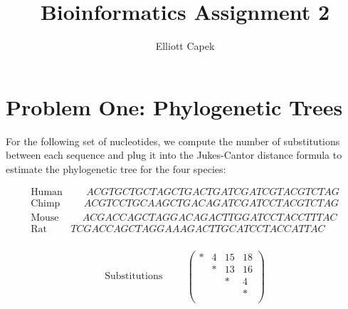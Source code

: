 \documentclass[10pt]{article} %
\title{Bioinformatics Assignment 2}
\author{Elliott Capek}
\begin{document}
\maketitle{}

\section{Problem One: Phylogenetic Trees}
For the following set of nucleotides, we compute the number of substitutions between
each sequence and plug it into the Jukes-Cantor distance formula to estimate the
phylogenetic tree for the four species:

\begin{align*}
  \mbox{Human} \hspace{1cm}ACGTGCTGCTAGCTGACTGATCGATCGTACGTCTAG\\
  \mbox{Chimp} \hspace{1cm}ACGTCCTGCAAGCTGACAGATCGATCCTACGTCTAG\\
  \mbox{Mouse} \hspace{1cm}ACGACCAGCTAGGACAGACTTGGATCCTACCTTTAC\\
  \mbox{Rat}   \hspace{1cm}TCGACCAGCTAGGAAAGACTTGCATCCTACCATTAC\\
\end{align*}

\begin{align*}
  \mbox{Substitutions} \hspace{1cm}
  \begin{pmatrix}
    * & 4 & 15 & 18\\
    & * & 13 & 16\\
    & & * & 4\\
    & & & *\\
  \end{pmatrix}
\end{align*}
\end{document}
